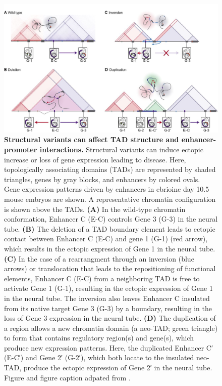 \documentclass[a4paper,twoside=true,openright,parskip=full,chapterprefix=true,11pt,headings=normal,bibliography=totoc,listof=totoc,titlepage=on,captions=tableabove,draft=false]{scrreprt}
\theoremstyle{definition}
\theoremstyle{definition}
\theoremstyle{definition}
\theoremstyle{remark}
\begin{document}
\begin{figure}

{\centering \includegraphics[width=0.8\linewidth]{figures/Andrey2017_Fig5} 

}

\caption{\textbf{Structural variants can affect TAD
structure and enhancer-promoter interactions.} Structural variants can
induce ectopic increase or loss of gene expression leading to disease.
Here, topologically associating domains (TADs) are represented by shaded
triangles, genes by gray blocks, and enhancers by colored ovals. Gene
expression patterns driven by enhancers in ebrioinc day 10.5 mouse
embryos are shown. A representative chromatin configuration is shown
above the TADs. \textbf{(A)} In the wild-type chromatin conformation,
Enhancer C (E-C) controls Gene 3 (G-3) in the neural tube. \textbf{(B)}
The deletion of a TAD boundary element leads to ectopic contact between
Enhancer C (E-C) and gene 1 (G-1) (red arrow), which results in the
ectopic expression of Gene 1 in the neural tube. \textbf{(C)} In the
case of a rearrangment through an inversion (blue arrows) or
translocation that leads to the repositioning of functional elements,
Enhancer C (E-C) from a neighboring TAD is free to activate Gene 1
(G-1), resulting in the ectopic expression of Gene 1 in the neural tube.
The inversion also leaves Enhancer C insulated from its native target
Gene 3 (G-3) by a boundary, resulting in the loss of Gene 3 expression
in the neural tube. \textbf{(D)} The duplication of a region allows a
new chromatin domain (a neo-TAD; green triangle) to form that contains
regulatory region(s) and gene(s), which produce new expression patterns.
Here, the duplicated Enhancer C′ (E-C′) and Gene 2′ (G-2′), which both
locate to the insulated neo-TAD, produce the ectopic expression of Gene
2′ in the neural tube. Figure and figure caption adpated from
\citep{Andrey2017}.}\label{fig:TadDisruptions}
\end{figure}
\end{document}
